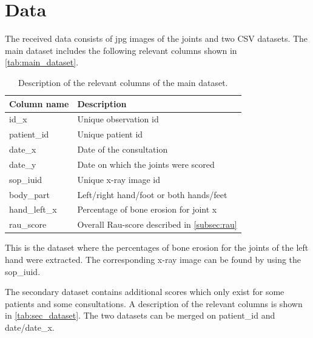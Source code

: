 \documentclass[12pt]{article}
\begin{document}
\newpage
\section{Data}
\label{sec:data}

The received data consists of jpg images of the joints and two CSV datasets. The main dataset includes the following relevant columns shown in \autoref{tab:main_dataset}.

\begin{table}[ht]
\centering
\caption{Description of the relevant columns of the main dataset.}
\label{tab:main_dataset}
\begin{tabular}{@{}ll@{}}
\toprule
Column name   & Description                                           \\ \midrule
id\_x         & Unique observation id                                 \\
patient\_id   & Unique patient id                                     \\
date\_x       & Date of the consultation                              \\
date\_y       & Date on which the joints were scored                  \\
sop\_iuid     & Unique x-ray image id                                 \\
body\_part    & Left/right hand/foot or both hands/feet               \\
hand\_left\_x & Percentage of bone erosion for joint x                \\
rau\_score    & Overall Rau-score described in \autoref{subsec:rau} \\ \bottomrule
\end{tabular}
\end{table}

This is the dataset where the percentages of bone erosion for the joints of the left hand were extracted. The corresponding x-ray image can be found by using the sop\_iuid.

The secondary dataset contains additional scores which only exist for some patients and some consultations. A description of the relevant columns is shown in \autoref{tab:sec_dataset}. The two datasets can be merged on patient\_id and date/date\_x.
\end{document}
